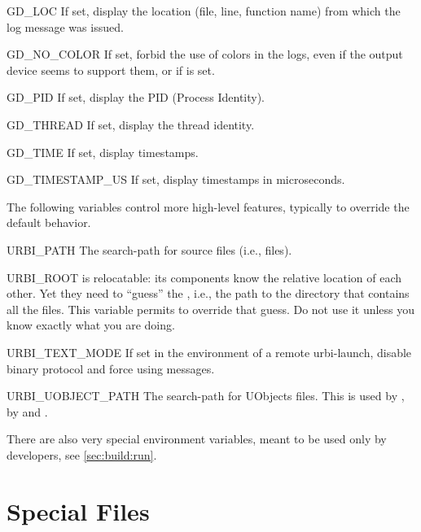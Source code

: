 \begin{envs}
\item[GD\_LOC] If set, display the location (file, line, function name) from
  which the log message was issued.

\item[GD\_NO\_COLOR] If set, forbid the use of colors in the logs, even if
  the output device seems to support them, or if  is set.

\item[GD\_PID] If set, display the PID (Process Identity).

\item[GD\_THREAD] If set, display the thread identity.

\item[GD\_TIME] If set, display timestamps.

\item[GD\_TIMESTAMP\_US] If set, display timestamps in microseconds.
\end{envs}

The following variables control more high-level features, typically to
override the default behavior.
\begin{envs}
\item[URBI\_PATH] The search-path for \us source files (i.e.,
   files).

\item[URBI\_ROOT] \usdk is relocatable: its components know
  the relative location of each other.  Yet they need to ``guess'' the
  , i.e., the path to the directory that contains all the
  files.  This variable permits to override that guess.  Do not use it
  unless you know exactly what you are doing.

\item[URBI\_TEXT\_MODE] If set in the environment of a remote urbi-launch,
  disable binary protocol and force using \us messages.

\item[URBI\_UOBJECT\_PATH] The search-path for UObjects files.
  This is used by , by
   and .
\end{envs}

There are also very special environment variables, meant to be used only by
\urbi developers, see \autoref{sec:build:run}.

\section{Special Files}
\label{sec:tools:files}

